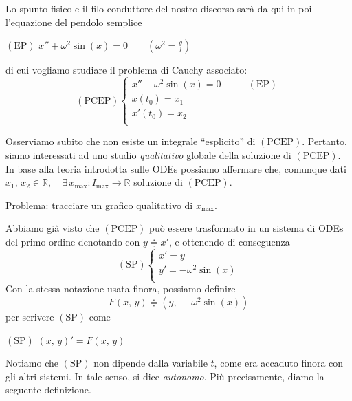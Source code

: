 Lo spunto fisico e il filo conduttore del nostro discorso sarà da qui in poi l'equazione del pendolo semplice
\begin{center}
$\mathrm{(EP)}$
\hfill
$\displaystyle
x'' + \omega^2\sin(x) = 0 \qquad \left( \omega^2 = \frac{g}{l} \right)
$
\hfill \null \\
\end{center}
di cui vogliamo studiare il problema di Cauchy associato:
$$
\mathrm{(PCEP)}
\begin{cases}
x'' + \omega^2\sin(x) = 0 &\qquad \mathrm{(EP)}\\
x(t_0) = x_1\\
x'(t_0) = x_2\\
\end{cases}
$$

Osserviamo subito che non esiste un integrale ``esplicito'' di $\mathrm{(PCEP)}$. Pertanto, siamo interessati ad uno studio \emph{qualitativo} globale della soluzione di $\mathrm{(PCEP)}$. In base alla teoria introdotta sulle ODEs possiamo affermare che, comunque dati $x_1,\,x_2 \in \mathbb{R}, \quad \exists \, x_{\max} : I_{\max} \longrightarrow \mathbb{R}$ soluzione di $\mathrm{(PCEP)}$.

\noindent\underline{Problema:} tracciare un grafico qualitativo di $x_{\max}$.

Abbiamo già visto che $\mathrm{(PCEP)}$ può essere trasformato in un sistema di ODEs del primo ordine denotando con $y \doteqdot x'$, e ottenendo di conseguenza
$$
\mathrm{(SP)}
\begin{cases}
x' = y\\
y' = -\omega^2\sin(x)\\
\end{cases}
$$
Con la stessa notazione usata finora, possiamo definire
$$
F(x,\,y) \doteqdot (y,\,-\omega^2\sin(x))
$$
per scrivere $\mathrm{(SP)}$ come
\begin{center}
$\mathrm{(SP)}$
\hfill
$\displaystyle
(x,\,y)' = F(x,\,y)
$
\hfill \null \\
\end{center}
Notiamo che $\mathrm{(SP)}$ non dipende dalla variabile $t$, come era accaduto finora con gli altri sistemi. In tale senso, si dice \emph{autonomo}. Più precisamente, diamo la seguente definizione.

